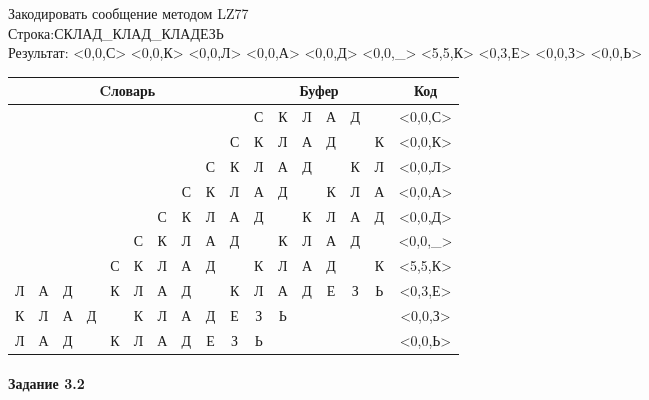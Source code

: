\documentclass[a4paper, 12pt]{article}
\begin{document}
Закодировать сообщение методом LZ77\\
Строка:СКЛАД\_КЛАД\_КЛАДЕЗЬ\\
Результат: <0,0,С> <0,0,К> <0,0,Л> <0,0,А> <0,0,Д> <0,0,\_> <5,5,К> <0,3,Е> <0,0,З> <0,0,Ь>\\
\begin{table}[h!]
\centering
\begin{tabular}{|c|c|c|c|c|c|c|c|c|c|c|c|c|c|c|c|c|} 
\hline
\multicolumn{10}{|c|}{Cловарь} & \multicolumn{6}{c|}{Буфер} & Код  \\ \hline
  &   &   &   &   &   &   &   &   &   & \cellcolor[HTML]{8CE4F6} С & К & Л & А & Д &   & <0,0,С>
\\ \hline
  &   &   &   &   &   &   &   &   & С & \cellcolor[HTML]{8CE4F6} К & Л & А & Д &   & К & <0,0,К>
\\ \hline
  &   &   &   &   &   &   &   & С & К & \cellcolor[HTML]{8CE4F6} Л & А & Д &   & К & Л & <0,0,Л>
\\ \hline
  &   &   &   &   &   &   & С & К & Л & \cellcolor[HTML]{8CE4F6} А & Д &   & К & Л & А & <0,0,А>
\\ \hline
  &   &   &   &   &   & С & К & Л & А & \cellcolor[HTML]{8CE4F6} Д &   & К & Л & А & Д & <0,0,Д>
\\ \hline
  &   &   &   &   & С & К & Л & А & Д & \cellcolor[HTML]{8CE4F6}   & К & Л & А & Д &   & <0,0,\_>
\\ \hline
  &   &   &   & С & \cellcolor[HTML]{FFFF00} К & \cellcolor[HTML]{FFFF00} Л & \cellcolor[HTML]{FFFF00} А & \cellcolor[HTML]{FFFF00} Д & \cellcolor[HTML]{FFFF00}   & \cellcolor[HTML]{FFFF00} К & \cellcolor[HTML]{FFFF00} Л & \cellcolor[HTML]{FFFF00} А & \cellcolor[HTML]{FFFF00} Д & \cellcolor[HTML]{FFFF00}   & \cellcolor[HTML]{8CE4F6} К & <5,5,К>
\\ \hline
\cellcolor[HTML]{FFFF00} Л & \cellcolor[HTML]{FFFF00} А & \cellcolor[HTML]{FFFF00} Д &   & К & Л & А & Д &   & К & \cellcolor[HTML]{FFFF00} Л & \cellcolor[HTML]{FFFF00} А & \cellcolor[HTML]{FFFF00} Д & \cellcolor[HTML]{8CE4F6} Е & З & Ь & <0,3,Е>
\\ \hline
К & Л & А & Д &   & К & Л & А & Д & Е & \cellcolor[HTML]{8CE4F6} З & Ь &   &   &   &   & <0,0,З>
\\ \hline
Л & А & Д &   & К & Л & А & Д & Е & З & \cellcolor[HTML]{8CE4F6} Ь &   &   &   &   &   & <0,0,Ь>
\\ \hline
\end{tabular}
\end{table}

\paragraph{Задание 3.2}
\end{document}
